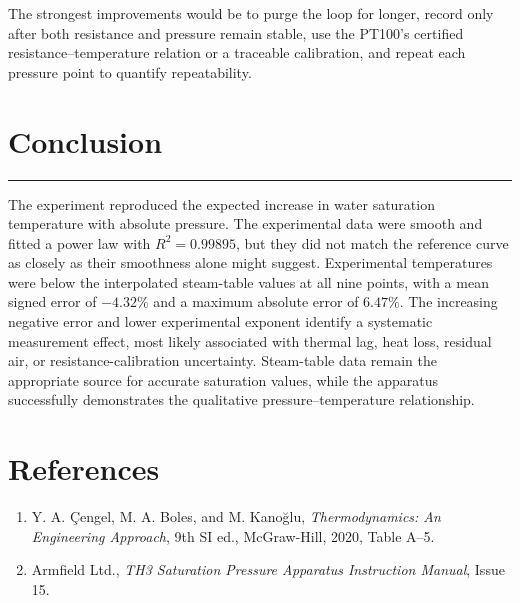 \documentclass[11pt,a4paper]{article}
\newcommand{\sectionrule}{\vspace{-2pt}\color{rulegray}\hrule\color{black}\vspace{5pt}}
\begin{document}
The strongest improvements would be to purge the loop for longer, record only
after both resistance and pressure remain stable, use the PT100's certified
resistance--temperature relation or a traceable calibration, and repeat each
pressure point to quantify repeatability.

\section{Conclusion}
\sectionrule
The experiment reproduced the expected increase in water saturation temperature
with absolute pressure. The experimental data were smooth and fitted a power
law with $R^2=0.99895$, but they did not match the reference curve as closely as
their smoothness alone might suggest. Experimental temperatures were below the
interpolated steam-table values at all nine points, with a mean signed error of
$-4.32\%$ and a maximum absolute error of $6.47\%$. The increasing negative
error and lower experimental exponent identify a systematic measurement effect,
most likely associated with thermal lag, heat loss, residual air, or
resistance-calibration uncertainty. Steam-table data remain the appropriate
source for accurate saturation values, while the apparatus successfully
demonstrates the qualitative pressure--temperature relationship.

\section*{References}
\begin{enumerate}
  \item Y. A. \c{C}engel, M. A. Boles, and M. Kano\u{g}lu,
  \emph{Thermodynamics: An Engineering Approach}, 9th SI ed., McGraw-Hill,
  2020, Table A--5.
  \item Armfield Ltd., \emph{TH3 Saturation Pressure Apparatus Instruction Manual},
  Issue 15.
\end{enumerate}
\end{document}
